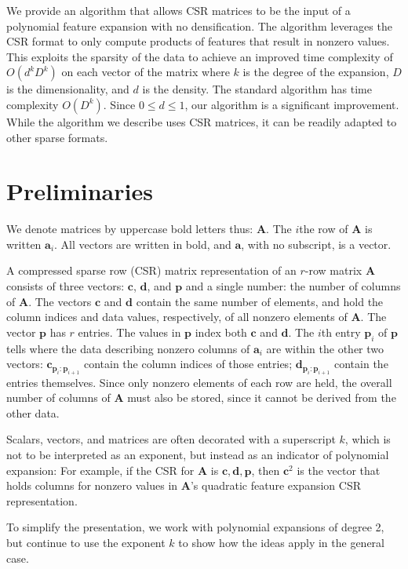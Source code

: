 \documentclass{article}
\begin{document}
We provide an algorithm that allows CSR matrices to be the input of a polynomial feature expansion with no densification.
The algorithm leverages the CSR format to only compute products of features that result in nonzero values.
This exploits the sparsity of the data to achieve an improved time complexity of $O(d^kD^k)$ on each vector of the matrix where $k$ is the degree of the expansion, $D$ is the dimensionality, and $d$ is the density.
The standard algorithm has time complexity $O(D^k)$.
Since $0 \le d \le 1$, our algorithm is a significant improvement.
While the algorithm we describe uses CSR matrices, it can be readily adapted to other sparse formats.

\section{Preliminaries}
We denote matrices by uppercase bold letters thus: $\bm{A}$. 
The $i$the row of $\bm{A}$ is written $\bm{a}_i$. All vectors are written in bold, and  $\bm{a}$, with no subscript, is a vector.

A compressed sparse row (CSR) matrix representation of an $r$-row matrix $\bm{A}$ consists of three vectors: $\bm{c}$, $\bm{d}$, and $\bm{p}$ and a single number: the number of columns of $\bm{A}$. The vectors
$\bm{c}$ and $\bm{d}$ contain the same number of elements, and hold the column indices and data values, respectively, of all nonzero elements of $\bm{A}$.
The vector $\bm{p}$ has $r$ entries. The values in $\bm{p}$ index both $\bm{c}$ and $\bm{d}$. The $i$th entry $\bm{p}_i$ of $\bm{p}$ tells where
the data describing nonzero columns of $\bm{a}_i$ are within the other two vectors: $\bm{c}_{\bm{p}_i:\bm{p}_{i+1}}$ contain the column indices of those entries; $\bm{d}_{\bm{p}_i:\bm{p}_{i+1}}$ contain the entries themselves.
Since only nonzero elements of each row are held, the overall number of columns of $\bm{A}$  must also be stored, since it cannot be derived
from the other data.

Scalars, vectors, and matrices are often decorated with a superscript $k$, which is not to be interpreted as an exponent, but instead as an indicator of polynomial expansion: 
For example, if the CSR for $\bm{A}$ is $\bm{c}, \bm{d}, \bm{p}$, then $\bm{c}^2$ is the vector that holds columns for nonzero values in $\bm{A}$'s quadratic feature expansion CSR representation.

To simplify the presentation, we work with polynomial expansions of degree 2, but continue to use the exponent $k$ to show how the ideas apply in the general case.
\end{document}
